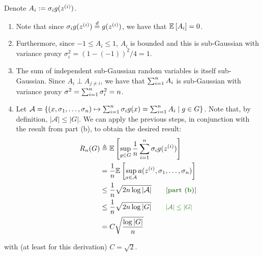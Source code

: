 \documentclass[11pt]{article}
\newcommand{\1}{\mathbb{I}} %
\begin{document}
Denote $A_i := \sigma_i g(\ival[i]{z})$.
\begin{enumerate}
	\item Note that since $\sigma_i g(\ival[i]{z}) \overset{d}{=} g(\ival[i]{z})$, we have that $\mathbb{E}_{}\left[A_i\right] = 0$.
	
	\item Furthermore, since $-1 \leq A_i \leq 1$, $A_i$ is bounded and this is sub-Gaussian with variance proxy $\sigma_i^2 = (1 - (-1))^2 / 4 = 1$. 
	
	\item The sum of independent sub-Gaussian random variables is itself sub-Gaussian. Since $A_i \perp A_{j \neq i}$, we have that $\sum_{i=1}^{n} A_i$ is sub-Gaussian with variance proxy $\sigma^2 = \sum_{i=1}^{n} \sigma_i^2 = n$. 
	
	\item Let $\mathcal A = \{ (x, \sigma_1, \ldots, \sigma_n) \mapsto \sum_{i=1}^{n} \sigma_i g(x) = \sum_{i=1}^{n} A_i  \mid g \in G  \}$. Note that, by definition, $|\mathcal A| \leq |G|$. We can apply the previous steps, in conjunction with the result from part (b), to obtain the desired result:
	\begin{align}
		R_n(G)
			&\triangleq \E{\sup_{g \in G} \inv{n} \insum \sigma_i g(\ival[i]{z}) } \\
			&= \inv{n} \E{\sup_{a \in \mathcal A} a(\ival[i]{z}, \sigma_1, \ldots, \sigma_n) } \\
			&\leq \inv{n} \sqrt{2n \log |\mathcal A|} \qquad \mtgreen{[part (b)]} \\
			&\leq \inv{n} \sqrt{2n \log |G|} \qquad \mgreen{|\mathcal A| \leq |G|} \\
			&= C \sqrt{\frac{\log |G|}{n}}
	\end{align}
\end{enumerate}
 with (at least for this derivation) $C = \sqrt{2}$. 
\end{document}
